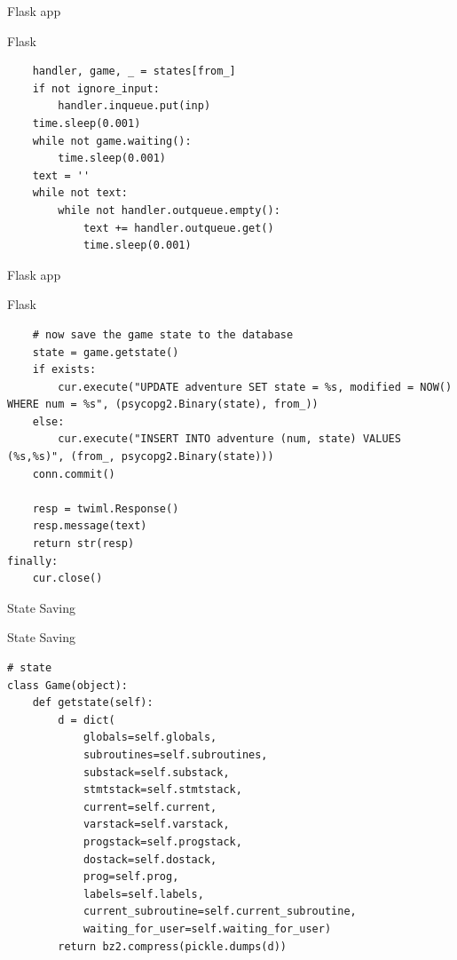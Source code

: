 \documentclass{beamer}
\def\py{
  \lstset{
     language=Python,
     extendedchars=true,
     basicstyle=\footnotesize\ttfamily,
     showstringspaces=false,
     showspaces=false,
     numbersep=9pt,
     tabsize=2,
     breaklines=true,
     showtabs=false,
     captionpos=b
  }
}
\begin{document}
\begin{frame}[fragile]{Flask app}
\begin{block}{Flask}
\py
\begin{lstlisting}
    handler, game, _ = states[from_]
    if not ignore_input:
        handler.inqueue.put(inp)
    time.sleep(0.001)
    while not game.waiting():
        time.sleep(0.001)
    text = ''
    while not text:
        while not handler.outqueue.empty():
            text += handler.outqueue.get()
            time.sleep(0.001)
\end{lstlisting}
\end{block}
\end{frame}
\begin{frame}[fragile]{Flask app}
\begin{block}{Flask}
\py
\begin{lstlisting}
    # now save the game state to the database
    state = game.getstate()
    if exists:
        cur.execute("UPDATE adventure SET state = %s, modified = NOW() WHERE num = %s", (psycopg2.Binary(state), from_))
    else:
        cur.execute("INSERT INTO adventure (num, state) VALUES (%s,%s)", (from_, psycopg2.Binary(state)))
    conn.commit()

    resp = twiml.Response()
    resp.message(text)
    return str(resp)
finally:
    cur.close()
\end{lstlisting}
\end{block}
\end{frame}

\begin{frame}[fragile]{State Saving}

\begin{block}{State Saving}
\py
\begin{lstlisting}
# state
class Game(object):
    def getstate(self):
        d = dict(
            globals=self.globals,
            subroutines=self.subroutines,
            substack=self.substack,
            stmtstack=self.stmtstack,
            current=self.current,
            varstack=self.varstack,
            progstack=self.progstack,
            dostack=self.dostack,
            prog=self.prog,
            labels=self.labels,
            current_subroutine=self.current_subroutine,
            waiting_for_user=self.waiting_for_user)
        return bz2.compress(pickle.dumps(d))
\end{lstlisting}
\end{block}
\end{frame}
\end{document}
